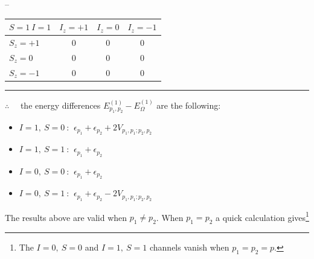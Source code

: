 \documentclass[
  letterpaper,
  DIV=11,
  numbers=noendperiod]{scrartcl}
\newcounter{none} %
\begin{document}
--

{\def\LTcaptype{none} %
\begin{longtable}[]{@{}lccc@{}}
\toprule\noalign{}
\(S=1\  I=1\) & \(I_z=+1\) & \(I_z=0\) & \(I_z=-1\) \\
\midrule\noalign{}
\endhead
\bottomrule\noalign{}
\endlastfoot
\(S_z=+1\) & \(0\) & \(0\) & \(0\) \\
\(S_z=0\) & \(0\) & \(0\) & \(0\) \\
\(S_z=-1\) & \(0\) & \(0\) & \(0\) \\
\end{longtable}
}

\begin{center}\rule{0.5\linewidth}{0.5pt}\end{center}

\begin{tcolorbox}[enhanced jigsaw, arc=.35mm, bottomrule=.15mm, bottomtitle=1mm, breakable, colback=white, colbacktitle=quarto-callout-note-color!10!white, colframe=quarto-callout-note-color-frame, coltitle=black, left=2mm, leftrule=.75mm, opacityback=0, opacitybacktitle=0.6, rightrule=.15mm, title=\textcolor{quarto-callout-note-color}{\faInfo}\hspace{0.5em}{Energy difference at \(\mathcal{O}(V)\) when \(p_1\ne p_2\)}, titlerule=0mm, toprule=.15mm, toptitle=1mm]

\(\therefore\quad\) the energy differences
\(E^{(1)}_{p_1,p_2}-E^{(1)}_\Omega\) are the following:

\begin{itemize}
\item
  \(I=1,\ S=0\ \):
  \(\ \epsilon_{p_1}+\epsilon_{p_2}+2V_{p_1,p_1;p_2,p_2}\)
\item
  \(I=1,\ S=1\ \): \(\ \epsilon_{p_1}+\epsilon_{p_2}\)
\item
  \(I=0,\ S=0\ \): \(\ \epsilon_{p_1}+\epsilon_{p_2}\)
\item
  \(I=0,\ S=1\ \):
  \(\ \epsilon_{p_1}+\epsilon_{p_2}-2V_{p_1,p_1;p_2,p_2}\)
\end{itemize}

\end{tcolorbox}

The results above are valid when \(p_1\ne p_2\). When \(p_1=p_2\) a
quick calculation gives\footnote{The \(I=0,\ S=0\) and \(I=1,\ S=1\)
  channels vanish when \(p_1=p_2=p\).}
\end{document}
